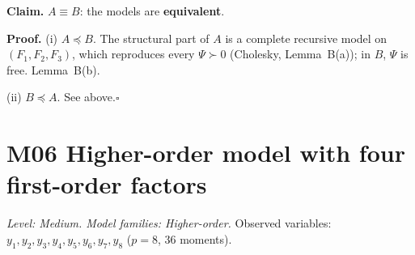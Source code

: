 \documentclass[10pt,a4paper]{article}
\newcommand{\nest}{\preceq}
\begin{document}
\par\bigskip
\noindent\textbf{Claim.} $A \equiv B$: the models are \textbf{equivalent}.\par\smallskip
\noindent\textbf{Proof.} (i) $A\nest B$. The structural part of $A$ is a complete recursive model on $(F_1,F_2,F_3)$, which reproduces every $\Psi\succ0$ (Cholesky, Lemma~B(a)); in $B$, $\Psi$ is free. Lemma~B(b).\par\smallskip
\noindent(ii) $B\nest A$. See above.\hfill$\square$\par\medskip
{}

\clearpage
\section*{M06 \quad Higher-order model with four first-order factors}
\noindent\textit{Level: Medium. Model families: Higher-order.} Observed variables: $y_{1}, y_{2}, y_{3}, y_{4}, y_{5}, y_{6}, y_{7}, y_{8}$ ($p=8$, 36 moments).\par\medskip
\end{document}
